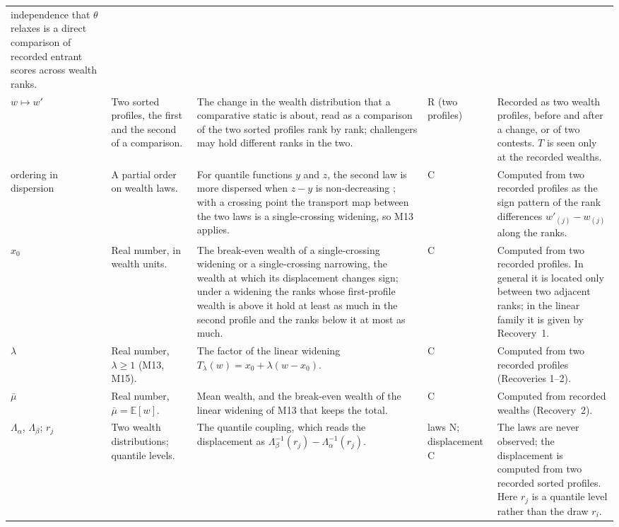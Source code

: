 \documentclass[11pt]{article}
\begin{document}
\begin{longtable}{@{}P{1.9cm}P{2.4cm}P{4.5cm}P{1.7cm}P{4.7cm}@{}}
  independence that $\theta$ relaxes is a direct comparison of recorded
  entrant scores across wealth ranks. \\ \addlinespace
$w\mapsto w'$ & Two sorted profiles, the first and the second of a
  comparison. & The change in the wealth distribution that a comparative static
  is about, read as a comparison of the two sorted profiles rank by rank;
  challengers may hold different ranks in the two. & R (two profiles) & Recorded as two
  wealth profiles, before and after a change, or of two contests. $T$ is seen
  only at the recorded wealths. \\ \addlinespace
ordering in dispersion & A partial order on wealth laws. & For quantile
  functions $y$ and $z$, the second law is more dispersed when $z-y$ is
  non-decreasing \citep{LewisThompson1981}; with a crossing point the transport
  map between the two laws is a single-crossing widening, so M13 applies. & C & Computed from
  two recorded profiles as the sign pattern of the rank differences
  $w'_{(j)}-w_{(j)}$ along the ranks. \\ \addlinespace
$x_0$ & Real number, in wealth units. & The break-even wealth of a
  single-crossing widening or a single-crossing narrowing, the wealth at which
  its displacement changes sign; under a widening the ranks whose first-profile
  wealth is above it hold at least as much in the second profile and the ranks
  below it at most as much. & C & Computed from two recorded profiles. In
  general it is located only between two adjacent ranks; in the linear family
  it is given by Recovery~1. \\ \addlinespace
$\lambda$ & Real number, $\lambda\ge1$ (M13, M15). & The factor of the linear widening
  $T_\lambda(w)=x_0+\lambda(w-x_0)$. & C & Computed from two recorded profiles
  (Recoveries 1--2). \\ \addlinespace
$\bar\mu$ & Real number, $\bar\mu=\mathbb E[w]$. & Mean wealth, and the break-even
  wealth of the linear widening of M13 that keeps the total. & C & Computed from
  recorded wealths (Recovery~2). \\ \addlinespace
$\Lambda_\alpha$, $\Lambda_\beta$; $r_j$ & Two wealth distributions; quantile
  levels. & The quantile coupling, which reads the displacement as
  $\Lambda_\beta^{-1}(r_j)-\Lambda_\alpha^{-1}(r_j)$. & laws N; displacement C & The laws are never
  observed; the displacement is computed from two recorded sorted profiles.
  Here $r_j$ is a quantile level rather than the draw $r_i$. \\
\end{longtable}
\normalsize
\end{document}
